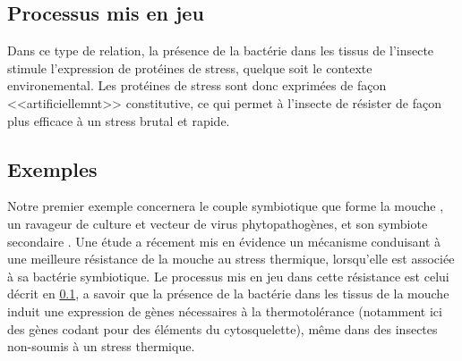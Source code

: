 \subsection{Processus mis en jeu} %
\label{sub:processus_mis_en_jeu}

Dans ce type de relation, la présence de la bactérie dans les tissus de
l'insecte stimule l'expression de protéines de stress, quelque soit le
contexte environemental. Les protéines de stress sont donc exprimées de façon
<<artificiellemnt>> constitutive, ce qui permet à l'insecte de résister de façon
plus efficace à un stress brutal et rapide.

\subsection{Exemples} %
\label{sub:exemples}


Notre premier exemple concernera le couple symbiotique que forme la mouche
, un ravageur de culture et vecteur de virus
phytopathogènes, et son symbiote secondaire . Une étude
\cite{brumin2011} a récement mis en évidence un mécanisme conduisant à une
meilleure résistance de la mouche au stress thermique, lorsqu'elle est
associée à sa bactérie symbiotique. Le processus mis en jeu dans cette
résistance est celui décrit en \ref{sub:processus_mis_en_jeu}, a savoir que la
présence de la bactérie dans les tissus de la mouche induit une expression de
gènes nécessaires à la thermotolérance (notamment ici des gènes codant pour
des éléments du cytosquelette), même dans des insectes non-soumis à un stress
thermique.
